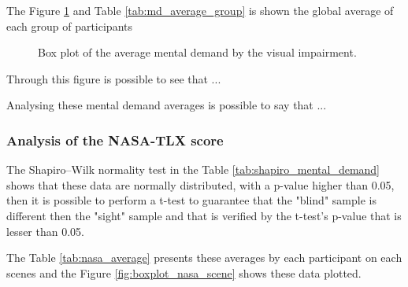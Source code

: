 The Figure \ref{fig:boxplot_md} and Table \ref{tab:md_average_group} is shown the global average of each group of participants

\begin{figure}[!htb]
    \centering
    \resizebox{0.8\linewidth}{!}{
        
    }
    \caption{Box plot of the average mental demand by the visual impairment.}
    \label{fig:boxplot_md}
\end{figure}

Through this figure is possible to see that ... 

Analysing these mental demand averages is possible to say that ...

\FloatBarrier

\subsubsection{Analysis of the NASA-TLX score}

The Shapiro–Wilk normality test in the Table \ref{tab:shapiro_mental_demand} shows that these data are normally distributed, with a p-value higher than 0.05, then it is possible to perform a t-test to guarantee that the "blind" sample is different then the "sight" sample and that is verified by the t-test's p-value that is lesser than 0.05.





The Table \ref{tab:nasa_average} presents these averages by each participant on each scenes and the Figure \ref{fig:boxplot_nasa_scene} shows these data plotted.




